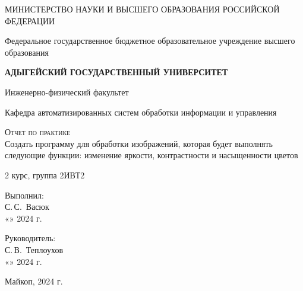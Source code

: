 \documentclass[14pt,a4paper]{scrartcl}
\begin{document}
	\begin{titlepage}
		\begin{center}
			\large
			МИНИСТЕРСТВО НАУКИ И ВЫСШЕГО ОБРАЗОВАНИЯ РОССИЙСКОЙ ФЕДЕРАЦИИ
			
			Федеральное государственное бюджетное образовательное учреждение высшего образования
			
			\textbf{АДЫГЕЙСКИЙ ГОСУДАРСТВЕННЫЙ УНИВЕРСИТЕТ}
			\vspace{0.25cm}
			
			Инженерно-физический факультет
			
			Кафедра автоматизированных систем обработки информации и управления
			\vfill

			\vfill
			
			\textsc{Отчет по практике}\\[5mm]
			
			{\LARGE Создать программу для обработки изображений, которая будет
выполнять следующие функции: изменение яркости, контрастности и
насыщенности цветов}
			\bigskip
			
			2 курс, группа 2ИВТ2
		\end{center}
		\vfill
		
		\newlength{\ML}
		\hfill\begin{minipage}{0.5\textwidth}
			Выполнил:\\
			\underline{\hspace{\ML}} С.\,С.~Васюк\\
			«\underline{\hspace{0.7cm}}» \underline{\hspace{2cm}} 2024 г.
		\end{minipage}%
		\bigskip
		
		\hfill\begin{minipage}{0.5\textwidth}
			Руководитель:\\
			\underline{\hspace{\ML}} С.\,В.~Теплоухов\\
			«\underline{\hspace{0.7cm}}» \underline{\hspace{2cm}} 2024 г.
		\end{minipage}%
		\vfill
		
		\begin{center}
			Майкоп, 2024 г.
		\end{center}
	\end{titlepage}
\tableofcontents
\newpage
\end{document}
